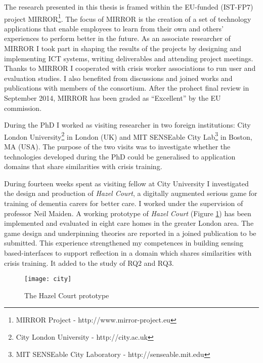 The research presented in this thesis is framed within the EU-funded
(IST-FP7) project MIRROR\footnote{MIRROR Project -
  http://www.mirror-project.eu}. The focus of MIRROR is the creation of
a set of technology applications that enable employees to learn from
their own and others' experiences to perform better in the future. As an
associate researcher of MIRROR I took part in shaping the results of the
projects by designing and implementing ICT systems, writing deliverables
and attending project meetings. Thanks to MIRROR I cooperated with
crisis worker associations to run user and evaluation studies. I also
benefited from discussions and joined works and publications with
members of the consortium. After the prohect final review in September
2014, MIRROR has been graded as ``Excellent'' by the EU commission.

During the PhD I worked as visiting researcher in two foreign
institutions: City London University\footnote{City London University -
  http://city.ac.uk} in London (UK) and MIT SENSEable City Lab\footnote{MIT
  SENSEable City Laboratory - http://senseable.mit.edu} in Boston, MA
(USA). The purpose of the two visits was to investigate whether the
technologies developed during the PhD could be generalised to
application domains that share similarities with crisis training.

During fourteen weeks spent as visiting fellow at City University I
investigated the design and production of \emph{Hazel Court}, a
digitally augmented serious game for training of dementia carers for
better care. I worked under the supervision of professor Neil Maiden. A
working prototype of \emph{Hazel Court} (Figure \ref{fig:hazel-court})
has been implemented and evaluated in eight care homes in the greater
London area. The game design and underpinning theories are reported in a
joined publication to be submitted. This experience strengthened my
competences in building sensing based-interfaces to support reflection
in a domain which shares similarities with crisis training. It added to
the study of RQ2 and RQ3.

\begin{figure}[h]
    \centering
    \texttt{[image: city]}
    \caption{The Hazel Court prototype}
    \label{fig:hazel-court}
\end{figure}

